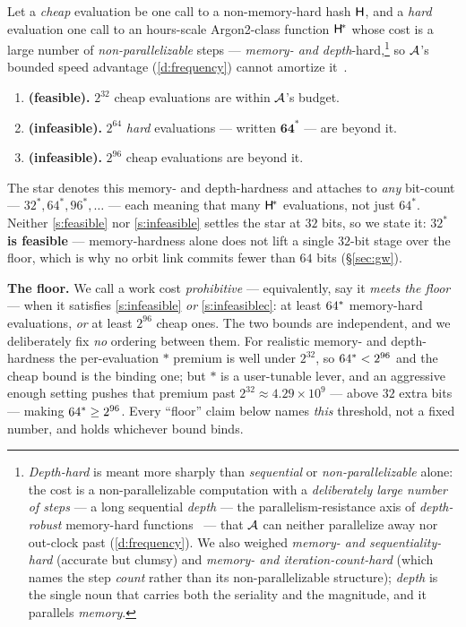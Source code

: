 \begin{stipulation}\label{ass:feas}
Let a \emph{cheap} evaluation be one call to a non-memory-hard hash $\mathsf{H}$,
and a \emph{hard} evaluation one call to an hours-scale Argon2-class function
$\mathsf{H}^{\!*}$ whose cost is a large number of \emph{non-parallelizable} steps ---
\emph{memory- and depth}-hard,\footnote{\emph{Depth-hard} is meant more sharply
than \emph{sequential} or \emph{non-parallelizable} alone: the cost is a
non-parallelizable computation with a \emph{deliberately large number of steps} ---
a long sequential \emph{depth} --- the parallelism-resistance axis of
\emph{depth-robust} memory-hard functions~\cite{depth-robust} --- that $\mathcal{A}$
can neither parallelize away nor out-clock past (\ref{d:frequency}). We also weighed \emph{memory- and
sequentiality-hard} (accurate but clumsy) and \emph{memory- and
iteration-count-hard} (which names the step \emph{count} rather than its
non-parallelizable structure); \emph{depth} is the single noun that carries both
the seriality and the magnitude, and it parallels \emph{memory}.} so
$\mathcal{A}$'s bounded speed advantage (\ref{d:frequency})
cannot amortize it~\cite{argon2}.
\begin{enumerate}[nosep,leftmargin=2.2em,label=\textbf{S\arabic*},ref=S\arabic*]
  \item\label{s:feasible} \textbf{(feasible).} $2^{32}$ cheap evaluations are within
        $\mathcal{A}$'s budget.
  \item\label{s:infeasible} \textbf{(infeasible).} $2^{64}$ \emph{hard} evaluations --- written
        $\mathbf{64^{*}}$ --- are beyond it.
  \item\label{s:infeasiblec} \textbf{(infeasible).} $2^{96}$ cheap evaluations are beyond it.
\end{enumerate}
The star denotes this memory- and depth-hardness and attaches to \emph{any}
bit-count --- $32^{*}, 64^{*}, 96^{*}, \dots$ --- each meaning that many $\mathsf{H}^{\!*}$
evaluations, not just $64^{*}$. Neither \ref{s:feasible} nor \ref{s:infeasible}
settles the star at $32$ bits, so we state it: \textbf{$32^{*}$ is feasible} ---
memory-hardness alone does not lift a single $32$-bit stage over the floor, which
is why no orbit link commits fewer than $64$ bits (\S\ref{sec:gw}).
\end{stipulation}

\noindent\textbf{The floor.} We call a work cost \emph{prohibitive} --- equivalently,
say it \emph{meets the floor} --- when it satisfies \ref{s:infeasible} \emph{or}
\ref{s:infeasiblec}: at least $64^{*}$ memory-hard evaluations, \emph{or} at least
$2^{96}$ cheap ones. The two bounds are independent, and we deliberately fix \emph{no}
ordering between them. For realistic memory- and depth-hardness the per-evaluation
$*$ premium is well under $2^{32}$, so $64^{*} < 2^{96}$ and the cheap bound is the
binding one; but $*$ is a user-tunable lever, and an aggressive enough setting pushes
that premium past $2^{32} \approx 4.29\times 10^{9}$ --- above $32$ extra bits ---
making $64^{*} \geq 2^{96}$. Every ``floor'' claim below names \emph{this} threshold,
not a fixed number, and holds whichever bound binds.

